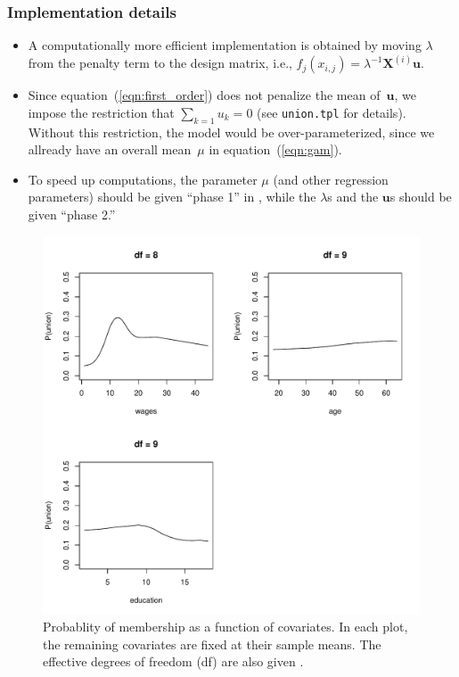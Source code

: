 \documentclass{admbmanual}
\begin{document}
\subsubsection{Implementation details}
\begin{itemize}
  \item A computationally more efficient implementation is obtained by moving
  $\lambda $ from the penalty term to the design matrix, i.e.,
  $f_{j}(x_{i,j})=\lambda ^{-1}\mathbf{X}^{(i)}\mathbf{u}$.

  \item Since equation~(\ref{eqn:first_order}) does not penalize the mean
  of~$\mathbf{u}$, we impose the restriction that $\sum_{k=1}u_{k}=0$ (see
  \texttt{union.tpl} for details). Without this restriction, the model would be
  over-parameterized, since we allready have an overall mean~$\mu $ in
  equation~(\ref{eqn:gam}).

  \item To speed up computations, the parameter $\mu $ (and other regression
  parameters) should be given ``phase 1'' in \scAB, while the $\lambda $s and
  the $\mathbf{u}$s should be given ``phase 2.''
\end{itemize}

\begin{figure}[h]
\centering\hskip1pt
\includegraphics[width=6in]{union_fig.pdf}
\caption{Probablity of membership as a function of covariates. In each plot,
the remaining covariates are fixed at their sample means. The effective
degrees of freedom (df) are also given \protect\cite{hast:tibs:1990}.}
\label{fig:union}
\end{figure}
\end{document}
